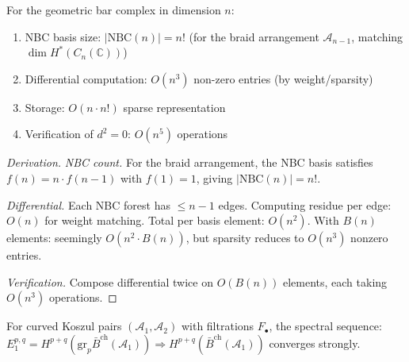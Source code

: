 \begin{theorem}
\label{thm:complexity-bounds}
For the geometric bar complex in dimension $n$:
\begin{enumerate}
\item NBC basis size: $|\mathrm{NBC}(n)| = n!$ (for the braid arrangement $\mathcal{A}_{n-1}$, matching $\dim H^*(C_n(\mathbb{C}))$)
\item Differential computation: $O(n^3)$ non-zero entries (by weight/sparsity)
\item Storage: $O(n \cdot n!)$ sparse representation
\item Verification of $d^2=0$: $O(n^5)$ operations
\end{enumerate}
\end{theorem}

\begin{proof}[Derivation]
\emph{NBC count.} For the braid arrangement, the NBC basis satisfies $f(n) = n \cdot f(n-1)$
with $f(1) = 1$, giving $|\mathrm{NBC}(n)| = n!$.

\emph{Differential.} Each NBC forest has $\leq n-1$ edges. 
Computing residue per edge: $O(n)$ for weight matching.
Total per basis element: $O(n^2)$.
With $B(n)$ elements: seemingly $O(n^2 \cdot B(n))$, but sparsity reduces to $O(n^3)$ nonzero entries.

\emph{Verification.} Compose differential twice on $O(B(n))$ elements, each taking $O(n^3)$ operations.
\end{proof}

\begin{theorem}\label{thm:spectral-convergence}
For curved Koszul pairs $(\mathcal{A}_1, \mathcal{A}_2)$ with filtrations $F_\bullet$, the spectral sequence:
$E_1^{p,q} = H^{p+q}(\text{gr}_p \bar{B}^{\text{ch}}(\mathcal{A}_1)) \Rightarrow H^{p+q}(\bar{B}^{\text{ch}}(\mathcal{A}_1))$
converges strongly.
\end{theorem}

